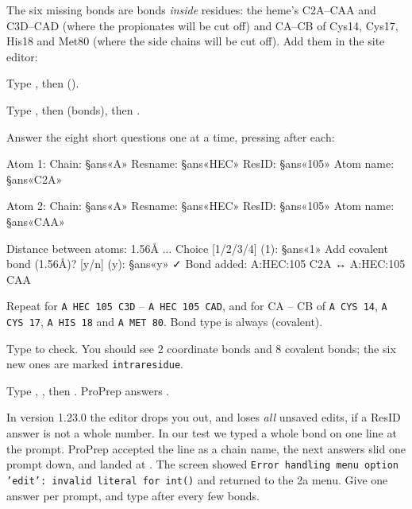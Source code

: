 The six missing bonds are bonds \emph{inside} residues: the heme's C2A--CAA
and C3D--CAD (where the propionates will be cut off) and CA--CB of Cys14,
Cys17, His18 and Met80 (where the side chains will be cut off). Add them in the
site editor:

\begin{steps}
  \item Type , then  ().
  \item Type , then  (bonds), then .
  \item Answer the eight short questions one at a time, pressing 
        after each:
\begin{screen}
Atom 1:
  Chain: §ans«A»
  Resname: §ans«HEC»
  ResID: §ans«105»
  Atom name: §ans«C2A»

Atom 2:
  Chain: §ans«A»
  Resname: §ans«HEC»
  ResID: §ans«105»
  Atom name: §ans«CAA»

Distance between atoms: 1.56Å
...
Choice [1/2/3/4] (1): §ans«1»
Add covalent bond (1.56Å)? [y/n] (y): §ans«y»
✓ Bond added: A:HEC:105 C2A ↔ A:HEC:105 CAA
\end{screen}
  \item Repeat  for \texttt{A HEC 105 C3D} -- \texttt{A HEC 105 CAD},
        and for CA -- CB of \texttt{A CYS 14}, \texttt{A CYS 17},
        \texttt{A HIS 18} and \texttt{A MET 80}. Bond type is always 
        (covalent).
  \item Type  to check. You should see 2 coordinate bonds and 8
        covalent bonds; the six new ones are marked \texttt{intraresidue}.
  \item Type , , then . ProPrep answers
        .
\end{steps}

\begin{watchout}
In version 1.23.0 the editor drops you out, and loses \emph{all} unsaved
edits, if a ResID answer is not a whole number. In our test we typed a whole
bond on one line at the  prompt. ProPrep accepted the line as a
chain name, the next answers slid one prompt down, and  landed at
. The screen showed
\texttt{Error handling menu option 'edit': invalid literal for int()} and
returned to the 2a menu. Give one answer per prompt, and type 
after every few bonds.
\end{watchout}

